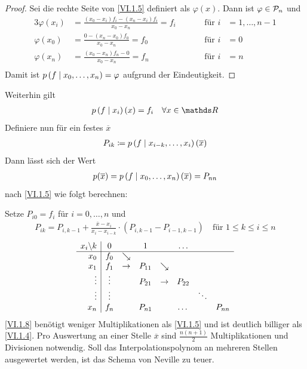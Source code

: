 \begin{proof}
  Sei die rechte Seite von \eqref{VI.1.5} definiert als $\varphi(x)$.
  Dann ist $\varphi\in\mathcal{P}_n$ und 
  \begin{alignat*}{3}
    \varphi(x_i) &= \frac{(x_0-x_i)f_i-(x_n-x_i)f_i}{x_0-x_n}= f_i\quad
    &&&\text{für } i&=1,\dotsc , n-1\\
    \varphi(x_0) &= \frac{0-(x_n-x_0)f_0}{x_0-x_n} = f_0
    &&&\text{für } i&=0\\
    \varphi(x_n) &= \frac{(x_0-x_n)f_n-0}{x_0-x_n} = f_n
    &&&\text{für } i&=n\\
  \end{alignat*}
  Damit ist $p\left( f \mid x_0,\dotsc,x_n \right)=\varphi$ aufgrund der Eindeutigkeit.
\end{proof}



Weiterhin gilt
\begin{gather}
  \ipol{p}{f}{x_i}(x) = f_i\quad \forall x\in\R
  \label{VI.1.6}
\end{gather}
Definiere nun für ein festes $\overline{x}$
\begin{gather}
  P_{ik} \coloneqq p\left( f \mid x_{i-k},\dotsc,x_{i} \right)(\overline{x})
  \label{VI.1.7}
\end{gather}
Dann lässt sich der Wert
\begin{gather*}
  p(\overline{x})=p\left( f \mid x_0,\dotsc,x_n \right)(\overline{x})= P_{nn}
\end{gather*}
nach \eqref{VI.1.5} wie folgt berechnen:

Setze $P_{i0}=f_i$ für $i=0,\dotsc,n$ und
\begin{gather}
  P_{ik} = P_{i,k-1}+\frac{\overline{x}-x_i}{x_i-x_{i-k}}
  \cdot \left( P_{i,k-1}-P_{i-1,k-1} \right)
  \quad \text{für } 1\leq k\leq i\leq n
  \label{VI.1.8}
\end{gather}
\begin{gather*}
  \begin{array}{r|cccccccccc}
    x_i\backslash k & 0 && 1 && \dots \\
    \cline{1-8}
    x_0 & f_0 & \searrow\\
    x_1 & f_1 & \rightarrow & P_{11}&\searrow\\
    \vdots & \vdots && P_{21} &\rightarrow& P_{22} \\
    \vdots  & \vdots && && &\ddots \\
    x_n & f_n && P_{n1} && \dots &&  P_{nn}
  \end{array}
\end{gather*}
\eqref{VI.1.8} benötigt weniger Multiplikationen als 
\eqref{VI.1.5} und ist deutlich billiger als
\eqref{VI.1.4}.
Pro Auswertung an einer Stelle $\overline{x}$ sind
$\frac{n(n+1)}{2}$ Multiplikationen und Divisionen notwendig.
Soll das Interpolationspolynom an mehreren Stellen ausgewertet werden,
ist das Schema von Neville zu teuer.


